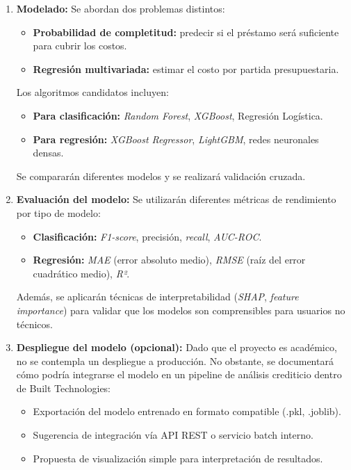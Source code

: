 \documentclass[
11pt, %
]{charter}
\begin{document}
\begin{enumerate}
  \item \textbf{Modelado:}  
  Se abordan dos problemas distintos:
  \begin{itemize}
    \item \textbf{Probabilidad de completitud:} predecir si el préstamo será suficiente para cubrir los costos.
    \item \textbf{Regresión multivariada:} estimar el costo por partida presupuestaria.
  \end{itemize}
  Los algoritmos candidatos incluyen:
  \begin{itemize}
    \item \textbf{Para clasificación:} \textit{Random Forest}, \textit{XGBoost}, Regresión Logística.
    \item \textbf{Para regresión:} \textit{XGBoost Regressor}, \textit{LightGBM}, redes neuronales densas.
  \end{itemize}
  Se compararán diferentes modelos y se realizará validación cruzada.

  \item \textbf{Evaluación del modelo:}  
  Se utilizarán diferentes métricas de rendimiento por tipo de modelo:
  \begin{itemize}
    \item \textbf{Clasificación:} \textit{F1-score}, precisión, \textit{recall}, \textit{AUC-ROC}.
    \item \textbf{Regresión:} \textit{MAE} (error absoluto medio), \textit{RMSE} (raíz del error cuadrático medio), \textit{R²}.
  \end{itemize}
  Además, se aplicarán técnicas de interpretabilidad (\textit{SHAP}, \textit{feature importance}) para validar que los modelos son comprensibles para usuarios no técnicos.

  \item \textbf{Despliegue del modelo (opcional):}  
  Dado que el proyecto es académico, no se contempla un despliegue a producción.  
  No obstante, se documentará cómo podría integrarse el modelo en un pipeline de análisis crediticio dentro de Built Technologies:
  \begin{itemize}
    \item Exportación del modelo entrenado en formato compatible (.pkl, .joblib).
    \item Sugerencia de integración vía API REST o servicio batch interno.
    \item Propuesta de visualización simple para interpretación de resultados.
  \end{itemize}
\end{enumerate}
\end{document}
